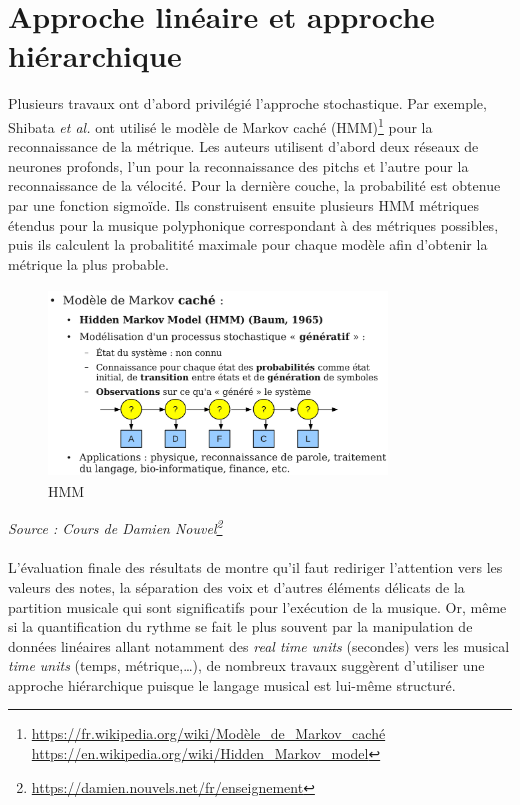 \section{Approche linéaire et approche hiérarchique}
Plusieurs travaux ont d’abord privilégié l’approche stochastique. Par exemple, Shibata \textit{et al.} \cite{SHIBATA2021262} ont utilisé le modèle de Markov caché (HMM)\footnote{\url{https://fr.wikipedia.org/wiki/Modèle_de_Markov_caché}\\\url{https://en.wikipedia.org/wiki/Hidden_Markov_model}} pour la reconnaissance de la métrique. Les auteurs utilisent d’abord deux réseaux de neurones profonds, l’un pour la reconnaissance des pitchs et l’autre pour la reconnaissance de la vélocité. Pour la dernière couche, la probabilité est obtenue par une fonction sigmoïde. Ils construisent ensuite plusieurs HMM métriques étendus pour la musique polyphonique correspondant à des métriques possibles, puis ils calculent la probalitité maximale pour chaque modèle afin d’obtenir la métrique la plus probable.\newpage
\begin{figure}[h]
	\centering
	\includegraphics[height=50mm, width=90mm]{z_images/2_etat_de_l_art/0_hmm.png}
	\caption{HMM}
\end{figure}
\textit{Source : Cours de Damien Nouvel\footnote{\url{https://damien.nouvels.net/fr/enseignement}}}\\\\
L’évaluation finale des résultats de \cite{SHIBATA2021262} montre qu’il faut rediriger l’attention vers les valeurs des notes, la séparation des voix et d'autres éléments délicats de la partition musicale qui sont significatifs pour l'exécution de la musique. Or, même si la quantification du rythme se fait le plus souvent par la manipulation de données linéaires allant notamment des \textit{real time units} (secondes) vers les musical \textit{time units} (temps, métrique,…), de nombreux travaux suggèrent d’utiliser une approche hiérarchique puisque le langage musical est lui-même structuré.\\
